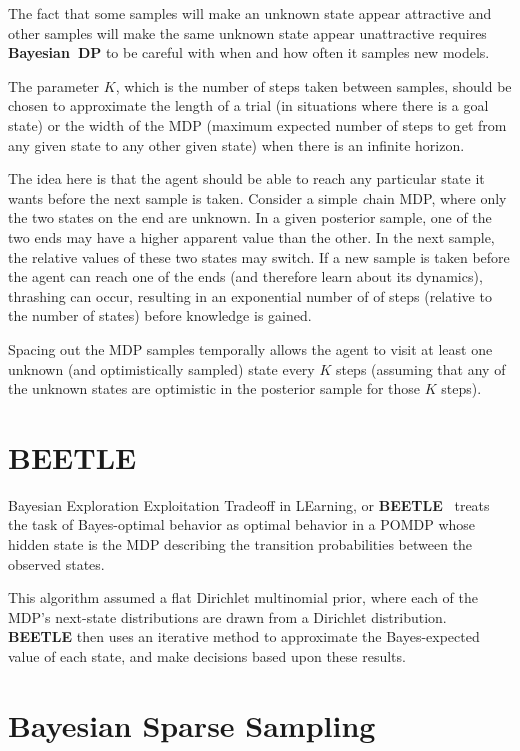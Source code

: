 The fact that some samples will make an unknown state appear attractive and other samples will make the same unknown state appear unattractive requires {\bf Bayesian~DP} to be careful with when and how often it samples new models.

The parameter $K$, which is the number of steps taken between samples, should be chosen to approximate the length of a trial (in situations where there is a goal state) or the width of the MDP (maximum expected number of steps to get from any given state to any other given state) when there is an infinite horizon.

The idea here is that the agent should be able to reach any particular state it wants before the next sample is taken. Consider a simple {\emph chain} MDP, where only the two states on the end are unknown. In a given posterior sample, one of the two ends may have a higher apparent value than the other. In the next sample, the relative values of these two states may switch. If a new sample is taken before the agent can reach one of the ends (and therefore learn about its dynamics), thrashing can occur, resulting in an exponential number of of steps (relative to the number of states) before knowledge is gained.

Spacing out the MDP samples temporally allows the agent to visit at least one unknown (and optimistically sampled) state every $K$ steps (assuming that any of the unknown states are optimistic in the posterior sample for those $K$ steps).



\section{BEETLE}

Bayesian Exploration Exploitation Tradeoff in LEarning, or {\bf BEETLE}~\cite{poupart06} treats the task of Bayes-optimal behavior as optimal behavior in a POMDP whose hidden state is the MDP describing the transition probabilities between the observed states.

This algorithm assumed a flat Dirichlet multinomial prior, where each of the MDP's next-state distributions are drawn from a Dirichlet distribution. {\bf BEETLE} then uses an iterative method to approximate the Bayes-expected value of each state, and make decisions based upon these results.



\section{Bayesian Sparse Sampling}

